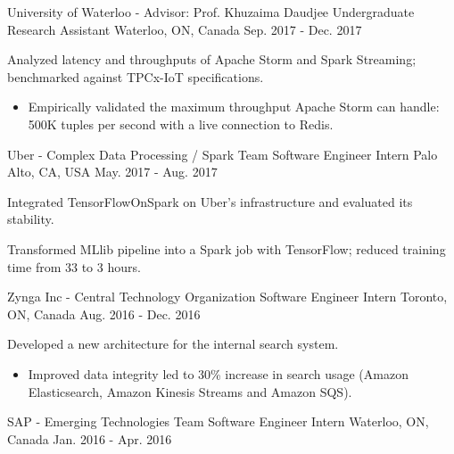 \begin{cventries}
{\begin{cvitems}
\end{cvitems}
}
\cventry
{University of Waterloo - Advisor: Prof. Khuzaima Daudjee} %
{Undergraduate Research Assistant} %
{Waterloo, ON, Canada} %
{Sep. 2017 - Dec. 2017} %
{ %
\begin{cvitems}
\item {Analyzed latency and throughputs of Apache Storm and Spark Streaming; benchmarked against TPCx-IoT specifications.}
\begin{itemize}[label=$\cdot$,leftmargin=0.7em]
\item {Empirically validated the maximum throughput Apache Storm can handle: 500K tuples per second with a live connection to Redis.}
\end{itemize}
\end{cvitems}
}
\cventry
{Uber - Complex Data Processing / Spark Team} %
{Software Engineer Intern} %
{Palo Alto, CA, USA} %
{May. 2017 - Aug. 2017} %
{ %
\begin{cvitems}
\item {Integrated TensorFlowOnSpark on Uber's infrastructure and evaluated its stability.}
\item {Transformed MLlib pipeline into a Spark job with TensorFlow; reduced training time from 33 to 3 hours.}
\end{cvitems}
}
\cventry
{Zynga Inc - Central Technology Organization} %
{Software Engineer Intern} %
{Toronto, ON, Canada} %
{Aug. 2016 - Dec. 2016} %
{ %
\begin{cvitems}
\item {Developed a new architecture for the internal search system.}
\begin{itemize}[label=$\cdot$,leftmargin=0.7em]
\item {Improved data integrity led to 30\% increase in search usage (Amazon Elasticsearch, Amazon Kinesis Streams and Amazon SQS).}
\end{itemize}
\end{cvitems}
}
\cventry
{SAP - Emerging Technologies Team} %
{Software Engineer Intern} %
{Waterloo, ON, Canada} %
{Jan. 2016 - Apr. 2016} %
{ %
}
\end{cventries}
